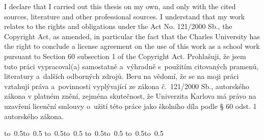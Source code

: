 \ifEN
I declare that I carried out this \ThesisTypeEN{} thesis on my own, and only with the cited sources, literature and other professional sources. I understand that my work relates to the rights and obligations under the Act No. 121/2000 Sb., the Copyright Act, as amended, in particular the fact that the Charles University has the right to conclude a license agreement on the use of this work as a school work pursuant to Section 60 subsection 1 of the Copyright Act.
\else
Prohlašuji, že jsem tuto \ThesisAccusativeCS{} práci vypracoval(a) samostatně a~výhradně s~použitím citovaných pramenů, literatury a~dalších odborných zdrojů. Beru na vědomí, že se na moji práci vztahují práva a~povinnosti vyplývající ze zákona č.~121/2000 Sb., autorského zákona v platném znění, zejména skutečnost, že Univerzita Karlova má právo na uzavření licenční smlouvy o~užití této práce jako školního díla podle § 60 odst. 1 autorského zákona.
\fi

\llmAffidavit
\endgroup

\vspace{10mm}


\ifEN
\hbox{\hbox to 0.5\hbox to 0.5\hsize{\dotfill\quad}}
\smallskip
\hbox{\hbox to 0.5\hsize{}\hbox to 0.5}
\else
\hbox{\hbox to 0.5\hbox to 0.5\hsize{\dotfill\quad}}
\smallskip
\hbox{\hbox to 0.5\hsize{}\hbox to 0.5}
\fi

\vspace{20mm}
\newpage


\openright

\noindent
\Dedication

\newpage


\def\infoblockCS{%
\vbox to 0.49\vsize{\InfoPageFont
\setlength\parindent{0mm}
\setlength\parskip{5mm}

Název práce:
\ThesisTitleCS

Autor:
\ThesisAuthor

\DeptTypeCS:
\DepartmentCS

Vedoucí \ThesisGenitiveCS{} práce:
\Supervisor, \SupervisorsDepartmentCS

Abstrakt:
\AbstractCS

Klíčová slova:
\KeywordsCS

\vss}}

